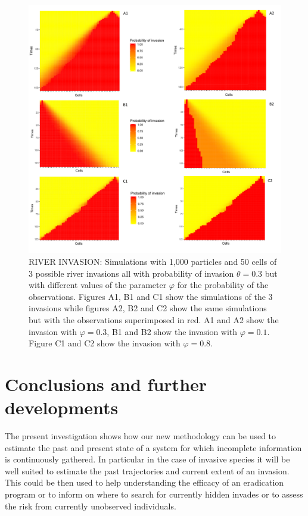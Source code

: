 \begin{figure}
    \includegraphics[width=\textwidth]{river_007.png}
    \caption{RIVER INVASION: Simulations with 1,000 particles and 50 cells of 3 possible river invasions all with probability of invasion $\theta = 0.3$ but with different values of the parameter $\varphi$ for the probability of the observations. Figures A1, B1 and C1 show the simulations of the 3 invasions while figures A2, B2 and C2 show the same simulations but with the observations superimposed in red. A1 and A2 show the invasion with $\varphi = 0.3$, B1 and B2 show the invasion with $\varphi = 0.1$. Figure C1 and C2 show the invasion with $\varphi = 0.8$.}
    \label{fig:2}
\end{figure}





\section{Conclusions and further developments}
\label{sec:9}

The present investigation shows how our new methodology can be used to estimate the past and present state of a system for which incomplete information is continuously gathered. In particular in the case of invasive species it will be well suited to estimate the past trajectories and current extent of an invasion. This could be then used to help understanding the efficacy of an eradication program or to inform on where to search for currently hidden invades or to assess the risk from currently unobserved individuals.

